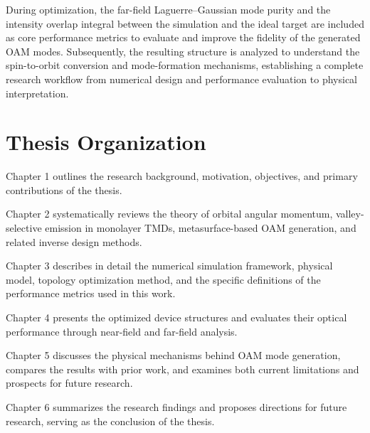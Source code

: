 During optimization, the far-field Laguerre--Gaussian mode purity and the intensity overlap integral between the simulation and the ideal target are included as core performance metrics to evaluate and improve the fidelity of the generated OAM modes.  Subsequently, the resulting structure is analyzed to understand the spin-to-orbit conversion and mode-formation mechanisms, establishing a complete research workflow from numerical design and performance evaluation to physical interpretation.

\section{Thesis Organization}

Chapter 1 outlines the research background, motivation, objectives, and primary contributions of the thesis.

Chapter 2 systematically reviews the theory of orbital angular momentum, valley-selective emission in monolayer TMDs, metasurface-based OAM generation, and related inverse design methods.

Chapter 3 describes in detail the numerical simulation framework, physical model, topology optimization method, and the specific definitions of the performance metrics used in this work.

Chapter 4 presents the optimized device structures and evaluates their optical performance through near-field and far-field analysis.

Chapter 5 discusses the physical mechanisms behind OAM mode generation, compares the results with prior work, and examines both current limitations and prospects for future research.

Chapter 6 summarizes the research findings and proposes directions for future research, serving as the conclusion of the thesis.
